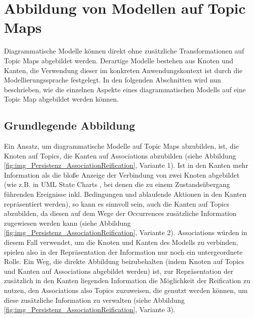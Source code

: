 
\section{Abbildung von Modellen auf Topic Maps} %
\label{sec:abbildung_von_modellen_auf_topic_maps}

Diagrammatische Modelle \citep[siehe etwa][]{Oppl05a} können direkt ohne zusätzliche Transformationen auf Topic Maps abgebildet werden. Derartige Modelle bestehen aus Knoten und Kanten, die Verwendung dieser im konkreten Anwendungskontext ist durch die Modellierungssprache festgelegt. In den folgenden Abschnitten wird nun beschrieben, wie die einzelnen Aspekte eines diagrammatischen Modells auf eine Topic Map abgebildet werden können.

\subsection{Grundlegende Abbildung} %
\label{sub:grundlegende_abbildung}
Ein Ansatz, um diagrammatische Modelle auf Topic Maps abzubilden, ist, die Knoten auf Topics, die Kanten auf Associations abzubilden (siehe Abbildung \ref{fig:img_Persistenz_AssociationReification}, Variante 1). Ist in den Kanten mehr Information als die bloße Anzeige der Verbindung von zwei Knoten abgebildet (wie z.B. in \gls{UML} State Charts \citep{Rumbaugh04}, bei denen die zu einem Zustandsübergang führenden Ereignisse inkl. Bedingungen und ablaufende Aktionen in den Kanten repräsentiert werden), so kann es sinnvoll sein, auch die Kanten auf Topics abzubilden, da diesen auf dem Wege der Occurrences zusätzliche Information zugewiesen werden kann (siehe Abbildung \ref{fig:img_Persistenz_AssociationReification}, Variante 2). Associations würden in diesem Fall verwendet, um die Knoten und Kanten des Modells zu verbinden, spielen also in der Repräsentation der Information nur noch ein untergeordnete Rolle. Ein Weg, die direkte Abbildung beizubehalten (indem Knoten auf Topics und Kanten auf Associations abgebildet werden) ist, zur Repräsentation der zusätzlich in den Kanten liegenden Information die Möglichkeit der Reification zu nutzen, den Associations also Topics zuzuweisen, die genutzt werden können, um diese zusätzliche Information zu verwalten (siehe Abbildung \ref{fig:img_Persistenz_AssociationReification}, Variante 3).


